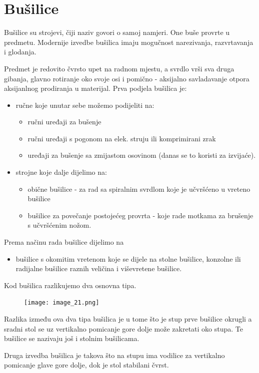 \documentclass[a4paper,12pt]{article}
\numberwithin{figure}{section}
\begin{document}
\section{Bušilice}
Bušilice su strojevi, čiji naziv govori o samoj namjeri. One buše provrte u predmetu. Modernije izvedbe bušilica imaju mogučnost narezivanja, razvrtavanja i glodanja. \par
Predmet je redovito čvrsto upet na radnom mjestu, a svrdlo vrši sva druga gibanja, glavno rotiranje oko svoje osi i pomično - aksijalno savladavanje otpora aksijanlnog prodiranja u materijal. 
Prva podjela bušilica je:
\begin{itemize}
\item ručne koje unutar sebe možemo podijeliti na:
\begin{itemize}
\item ručni uređaji za bušenje
\item ručni uređaji s pogonom na elek. struju ili komprimirani zrak
\item uređaji za bušenje sa zmijastom osovinom (danas se to koristi za izvijaće).
\end{itemize}
\item strojne koje dalje dijelimo na:
\begin{itemize}
\item obične bušilice - za rad sa spiralnim svrdlom koje je učvršćeno u vreteno bušilice
\item bušilice za povečanje postojećeg provrta - koje rade motkama za brušenje s učvršćenim nožom.
\end{itemize}
\end{itemize} 
Prema načinu rada bušilice dijelimo na
\begin{itemize}
\item bušilice s okomitim vretenom koje se dijele na stolne bušilice, konzolne ili radijalne bušilice raznih veličina i viševretene bušilice.
\end{itemize}
Kod bušilica razlikujemo dva osnovna tipa.
\begin{figure}[!h]
\centering
\texttt{[image: image\_21.png]}
\end{figure}
\FloatBarrier
Razlika između ova dva tipa  bušilica je u tome što je stup prve bušilice okrugli a sradni stol se uz vertikalno pomicanje gore dolje može zakretati oko stupa. Te bušilice se nazivaju još i stolnim bušilicama. \par
Druga izvedba bušilica je takova što na stupu ima vodilice za vertikalno pomicanje glave gore dolje, dok je stol stabilani čvrst. \par
\end{document}
